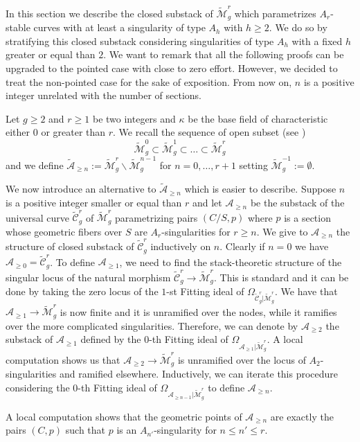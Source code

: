 \documentclass{alggeom}
\numberwithin{equation}{section}
\numberwithin{subsection}{section}
\theoremstyle{definition}
\theoremstyle{remark}
\newcommand\cA{\mathcal{A}} \newcommand\cB{\mathcal{B}}
\renewcommand{\setminus}{\smallsetminus}
\newcommand{\Mtilde}{\widetilde{\mathcal M}}
\newcommand{\Ctilde}{\widetilde{\mathcal C}}
\begin{document}
In this section we describe the closed substack of $\Mtilde_g^r$ which parametrizes $A_r$-stable curves with at least a singularity of type $A_h$ with $h\geq 2$. We do so by stratifying this closed substack considering singularities of type $A_h$ with a fixed $h$ greater or equal than $2$. We want to remark that all the following proofs can be upgraded to the pointed case with close to zero effort. However, we decided to treat the non-pointed case for the sake of exposition. From now on, $n$ is a positive integer unrelated with the number of sections. 


Let $g\geq 2$ and $r\geq 1$ be two integers and $\kappa$ be the base field of characteristic either $0$ or greater than $r$. We recall the sequence of open subset (see )
$$ \Mtilde_g^0 \subset \Mtilde_g^1 \subset \dots \subset \Mtilde_g^r$$ 
and we define $\widetilde{\cA}_{\geq n}:=\Mtilde_g^r\setminus \Mtilde_g^{n-1}$ for $n=0,\dots,r+1$ setting $\Mtilde_g^{-1}:=\emptyset$. 


We now introduce an alternative to $\widetilde{\cA}_{\geq n}$ which is easier to describe. Suppose $n$ is a positive integer smaller or equal than $r$ and let $\cA_{\geq n}$ be the substack of the universal curve $\Ctilde_g^r$ of $\Mtilde_g^r$ parametrizing pairs $(C/S,p)$ where $p$ is a section whose geometric fibers over $S$ are $A_r$-singularities for $r\geq n$. We give to $\cA_{\geq n}$ the structure of closed substack of $\Ctilde_g^r$ inductively on $n$. Clearly if $n=0$ we have $\cA_{\geq 0}=\Ctilde_g^r$. To define $\cA_{\geq 1}$, we need to find the stack-theoretic structure of the singular locus of the natural morphism $\Ctilde_g^r \rightarrow \Mtilde_g^r$. This is standard and it can be done by taking the zero locus of the $1$-st Fitting ideal of $\Omega_{\Ctilde_g^r|\Mtilde_g^r}$. We have that $\cA_{\geq 1}\rightarrow  \Mtilde_g^r$ is now finite and it is unramified over the nodes, while it ramifies over the more complicated singularities. Therefore, we can denote by $\cA_{\geq 2}$ the substack of $\cA_{\geq 1}$ defined by the $0$-th Fitting ideal of $\Omega_{\cA_{\geq 1}|\Mtilde_g^r}$. A local computation shows us that $\cA_{\geq 2} \rightarrow \Mtilde_g^r$ is unramified over the locus of $A_2$-singularities and ramified elsewhere. Inductively, we can iterate this procedure considering the $0$-th Fitting ideal of $\Omega_{\cA_{\geq n-1}|\Mtilde_g^r}$ to define $\cA_{\geq n}$. 

A local computation shows that the geometric points of $\cA_{\geq n}$ are exactly the pairs $(C,p)$ such that $p$ is an $A_{n'}$-singularity for $n\leq n'\leq r$.
\end{document}
